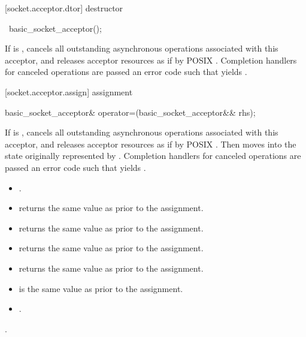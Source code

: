 [socket.acceptor.dtor]{ destructor}

\begin{itemdecl}
~basic_socket_acceptor();
\end{itemdecl}

\begin{itemdescr}
\pnum
\effects If  is , cancels all outstanding asynchronous operations associated with this acceptor, and releases acceptor resources as if by POSIX . Completion handlers for canceled operations are passed an error code  such that  yields .
\end{itemdescr}



[socket.acceptor.assign]{ assignment}

\begin{itemdecl}
basic_socket_acceptor& operator=(basic_socket_acceptor&& rhs);
\end{itemdecl}

\begin{itemdescr}
\pnum
\effects If  is , cancels all outstanding asynchronous operations associated with this acceptor, and releases acceptor resources as if by POSIX . Then moves into  the state originally represented by . Completion handlers for canceled operations are passed an error code  such that  yields .

\pnum
\postconditions
\begin{itemize}
\item
{}.
\item
{} returns the same value as  prior to the assignment.
\item
{} returns the same value as  prior to the assignment.
\item
{} returns the same value as  prior to the assignment.
\item
{} returns the same value as  prior to the assignment.
\item
{} is the same value as  prior to the assignment.
\item
{}.
\end{itemize}

\pnum
\returns {}.
\end{itemdescr}

